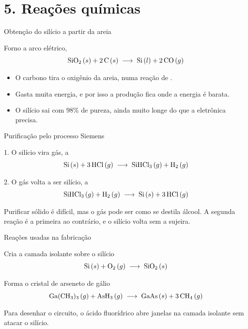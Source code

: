 \section{5. Reações químicas}

\begin{frame}{Obtenção do silício a partir da areia}
  \begin{block}{Forno a arco elétrico, }
    \[ \mathrm{SiO_2}\,(s) + 2\,\mathrm{C}\,(s) \;\longrightarrow\; \mathrm{Si}\,(l) + 2\,\mathrm{CO}\,(g) \]
  \end{block}
  \vspace{0.2cm}
  \begin{itemize}
    \item O carbono tira o oxigênio da areia, numa reação de
          .
    \item Gasta muita energia, e por isso a produção fica onde a energia é
          barata.
    \item O silício sai com 98\% de pureza, ainda \alert{muito longe} do que
          a eletrônica precisa.
  \end{itemize}
\end{frame}

\begin{frame}{Purificação pelo processo Siemens}
  \begin{block}{1. O silício vira gás, a }
    \[ \mathrm{Si}\,(s) + 3\,\mathrm{HCl}\,(g) \;\longrightarrow\; \mathrm{SiHCl_3}\,(g) + \mathrm{H_2}\,(g) \]
  \end{block}
  \begin{block}{2. O gás volta a ser silício, a }
    \[ \mathrm{SiHCl_3}\,(g) + \mathrm{H_2}\,(g) \;\longrightarrow\; \mathrm{Si}\,(s) + 3\,\mathrm{HCl}\,(g) \]
  \end{block}
  \vspace{0.2cm}
  \centering\small
  Purificar sólido é difícil, mas o gás pode ser  como se
  destila álcool. A segunda reação é a primeira \alert{ao contrário}, e o
  silício volta sem a sujeira.
\end{frame}

\begin{frame}{Reações usadas na fabricação}
  \begin{block}{Cria a camada isolante sobre o silício}
    \[ \mathrm{Si}\,(s) + \mathrm{O_2}\,(g) \;\longrightarrow\; \mathrm{SiO_2}\,(s) \]
  \end{block}
  \vspace{0.2cm}
  \begin{block}{Forma o cristal de arseneto de gálio}
    \[ \mathrm{Ga(CH_3)_3}\,(g) + \mathrm{AsH_3}\,(g) \;\longrightarrow\; \mathrm{GaAs}\,(s) + 3\,\mathrm{CH_4}\,(g) \]
  \end{block}
  \vspace{0.3cm}
  \centering\small
  Para desenhar o circuito, o ácido fluorídrico abre janelas na camada
  isolante sem atacar o silício.
\end{frame}
